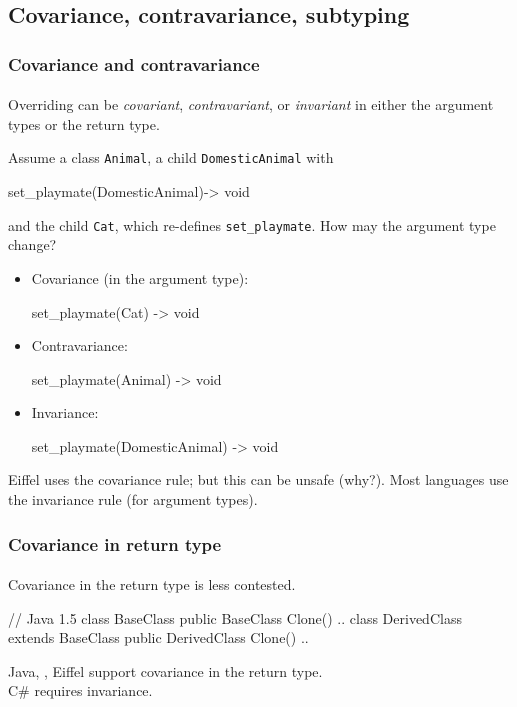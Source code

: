 \documentclass{beamer}
\begin{document}
\subsection{Covariance, contravariance, subtyping}
\begin{frame}[fragile]
\frametitle{Covariance and contravariance}
\framesubtitle{}
Overriding can be \textit{covariant}, 
\textit{contravariant}, or \textit{invariant} in either
the argument types or the return type.
\bigskip


Assume a class \texttt{Animal}, a child \texttt{DomesticAnimal} with 
\begin{cplus3}
       set_playmate(DomesticAnimal)->  void 
\end{cplus3}

and the child \texttt{Cat},
which re-defines \texttt{set_playmate}. 
How may the argument type change?%
\begin{itemize}
\item Covariance (in the argument type):
\begin{cplus3}
 set_playmate(Cat) -> void
\end{cplus3}
 \item Contravariance:
\begin{cplus3}
 set_playmate(Animal) -> void
\end{cplus3}
  \item Invariance: 
\begin{cplus3}
 set_playmate(DomesticAnimal) -> void
\end{cplus3}


\end{itemize}
Eiffel uses the covariance rule; but this can be unsafe (why?).
Most languages use the invariance rule (for argument types). 
\end{frame}

\begin{frame}[fragile]
\frametitle{Covariance in return type}
\framesubtitle{}
Covariance in the return type is less contested.
\bigskip

\begin{cplus3}
// Java 1.5
class BaseClass {
    public BaseClass Clone() {..}
}
class DerivedClass extends BaseClass {
    public DerivedClass Clone() {..}
}
\end{cplus3}
Java, \Cpp, Eiffel support covariance in the return type.\\
C\# requires invariance. 
\end{frame}
\end{document}

